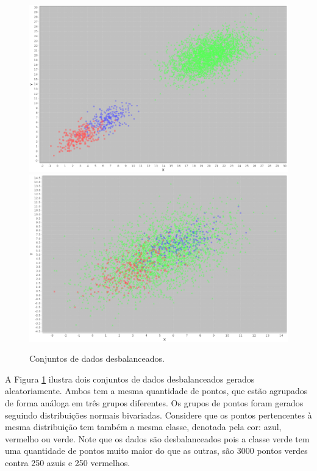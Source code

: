 \begin{figure}[h!]
  \includegraphics[width=\linewidth]{images/random_data_01.eps}
  \includegraphics[width=\linewidth]{images/random_data_50.eps}
  \caption{Conjuntos de dados desbalanceados.}
  \label{fig:dadosdesbalanceados}
\end{figure}

A Figura \ref{fig:dadosdesbalanceados} ilustra dois conjuntos de dados desbalanceados gerados aleatoriamente.
Ambos tem a mesma quantidade de pontos, que estão agrupados de forma análoga em três grupos diferentes.
Os grupos de pontos foram gerados seguindo distribuições normais bivariadas.
Considere que os pontos pertencentes à mesma distribuição tem também a mesma classe, denotada pela cor: azul, vermelho ou verde.
Note que os dados são desbalanceados pois a classe verde tem uma quantidade de pontos muito maior do que as outras, são 3000 pontos verdes contra 250 azuis e 250 vermelhos.

